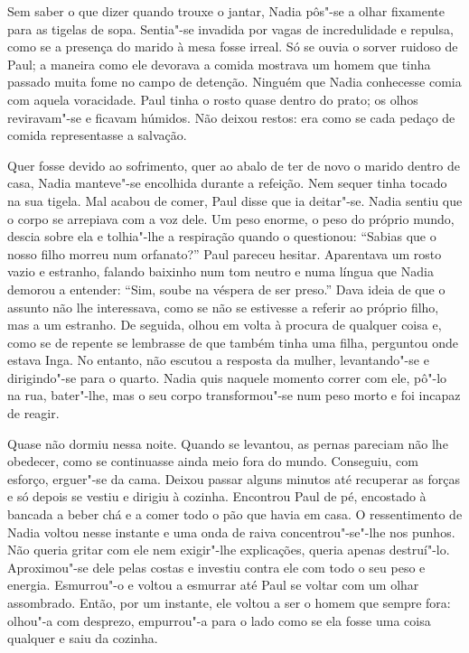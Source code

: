 Sem saber o que dizer quando trouxe o jantar, Nadia pôs"-se a olhar
fixamente para as tigelas de sopa. Sentia"-se invadida por vagas de
incredulidade e repulsa, como se a presença do marido à mesa fosse
irreal. Só se ouvia o sorver ruidoso de Paul; a maneira como ele
devorava a comida mostrava um homem que tinha passado muita fome no
campo de detenção. Ninguém que Nadia conhecesse comia com aquela
voracidade. Paul tinha o rosto quase dentro do prato; os olhos
reviravam"-se e ficavam húmidos. Não deixou restos: era como se cada
pedaço de comida representasse a salvação.

Quer fosse devido ao sofrimento, quer ao abalo de ter de novo o marido
dentro de casa, Nadia manteve"-se encolhida durante a refeição. Nem
sequer tinha tocado na sua tigela. Mal acabou de comer, Paul disse que
ia deitar"-se. Nadia sentiu que o corpo se arrepiava com a voz dele. Um
peso enorme, o peso do próprio mundo, descia sobre ela e
tolhia"-lhe a respiração quando o questionou: ``Sabias que o nosso filho
morreu num orfanato?'' Paul pareceu hesitar. Aparentava um rosto vazio e
estranho, falando baixinho num tom neutro e numa língua que Nadia
demorou a entender: ``Sim, soube na véspera de ser preso.'' Dava ideia de
que o assunto não lhe interessava, como se não se estivesse a referir
ao próprio filho, mas a um estranho. De seguida, olhou em volta à
procura de qualquer coisa e, como se de repente se lembrasse de que
também tinha uma filha, perguntou onde estava Inga. No entanto, não
escutou a resposta da mulher, levantando"-se e dirigindo"-se para o
quarto. Nadia quis naquele momento correr com ele, pô"-lo na rua,
bater"-lhe, mas o seu corpo transformou"-se num peso morto e foi incapaz
de reagir.

Quase não dormiu nessa noite. Quando se levantou, as
pernas pareciam não lhe obedecer, como se continuasse ainda meio fora do
mundo. Conseguiu, com esforço, erguer"-se da cama. Deixou passar alguns
minutos até recuperar as forças e só depois se vestiu e dirigiu à
cozinha. Encontrou Paul de pé, encostado à bancada a beber chá e a comer
todo o pão que havia em casa. O ressentimento de Nadia voltou nesse
instante e uma onda de raiva concentrou"-se"-lhe nos punhos. Não queria
gritar com ele nem exigir"-lhe explicações, queria apenas destruí"-lo.
Aproximou"-se dele pelas costas e investiu contra ele com todo o seu peso
e energia. Esmurrou"-o e voltou a esmurrar até Paul se voltar com um
olhar assombrado. Então, por um instante, ele voltou a ser o homem que
sempre fora: olhou"-a com desprezo, empurrou"-a para o lado como se ela
fosse uma coisa qualquer e saiu da cozinha.

